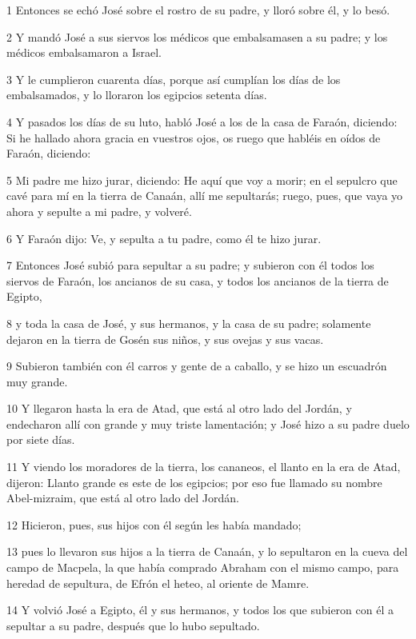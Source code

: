 \par 1 Entonces se echó José sobre el rostro de su padre, y lloró sobre él, y lo besó.
\par 2 Y mandó José a sus siervos los médicos que embalsamasen a su padre; y los médicos embalsamaron a Israel.
\par 3 Y le cumplieron cuarenta días, porque así cumplían los días de los embalsamados, y lo lloraron los egipcios setenta días.
\par 4 Y pasados los días de su luto, habló José a los de la casa de Faraón, diciendo: Si he hallado ahora gracia en vuestros ojos, os ruego que habléis en oídos de Faraón, diciendo:
\par 5 Mi padre me hizo jurar, diciendo: He aquí que voy a morir; en el sepulcro que cavé para mí en la tierra de Canaán, allí me sepultarás; ruego, pues, que vaya yo ahora y sepulte a mi padre, y volveré.
\par 6 Y Faraón dijo: Ve, y sepulta a tu padre, como él te hizo jurar.
\par 7 Entonces José subió para sepultar a su padre; y subieron con él todos los siervos de Faraón, los ancianos de su casa, y todos los ancianos de la tierra de Egipto,
\par 8 y toda la casa de José, y sus hermanos, y la casa de su padre; solamente dejaron en la tierra de Gosén sus niños, y sus ovejas y sus vacas.
\par 9 Subieron también con él carros y gente de a caballo, y se hizo un escuadrón muy grande.
\par 10 Y llegaron hasta la era de Atad, que está al otro lado del Jordán, y endecharon allí con grande y muy triste lamentación; y José hizo a su padre duelo por siete días.
\par 11 Y viendo los moradores de la tierra, los cananeos, el llanto en la era de Atad, dijeron: Llanto grande es este de los egipcios; por eso fue llamado su nombre Abel-mizraim, que está al otro lado del Jordán.
\par 12 Hicieron, pues, sus hijos con él según les había mandado;
\par 13 pues lo llevaron sus hijos a la tierra de Canaán, y lo sepultaron en la cueva del campo de Macpela, la que había comprado Abraham con el mismo campo, para heredad de sepultura, de Efrón el heteo, al oriente de Mamre.
\par 14 Y volvió José a Egipto, él y sus hermanos, y todos los que subieron con él a sepultar a su padre, después que lo hubo sepultado.

